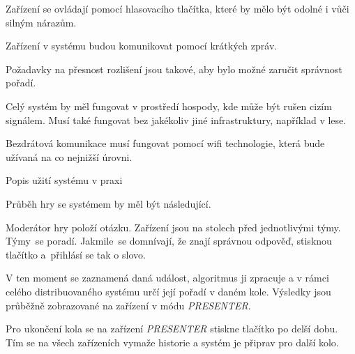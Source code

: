 Zařízení se ovládají pomocí hlasovacího tlačítka, které by mělo být odolné i vůči silným nárazům.

Zařízení v systému budou komunikovat pomocí krátkých zpráv.

Požadavky na přesnost rozlišení jsou takové, aby bylo možné zaručit správnost pořadí.

Celý systém by měl fungovat v prostředí hospody, kde může být rušen cizím signálem. Musí také fungovat bez jakékoliv jiné infrastruktury, například v lese.

Bezdrátová komunikace musí fungovat pomocí wifi technologie, která bude užívaná na co nejnižší úrovni.

\sec Popis užití systému v praxi

Průběh hry se systémem by měl být následující.

Moderátor hry položí otázku. Zařízení jsou na stolech před jednotlivými týmy. Týmy~se poradí. Jakmile~se domnívají, že znají správnou odpověď, stisknou tlačítko a~přihlásí se tak o slovo.

V ten moment se zaznamená daná událost, algoritmus ji zpracuje a v rámci celého distribuovaného systému určí její pořadí v daném kole. Výsledky jsou průběžně zobrazované na zařízení v módu {\em PRESENTER}.

Pro ukončení kola se na zařízení {\em PRESENTER} stiskne tlačítko po delší dobu. Tím se na všech zařízeních vymaže historie a systém je připrav pro další kolo.
